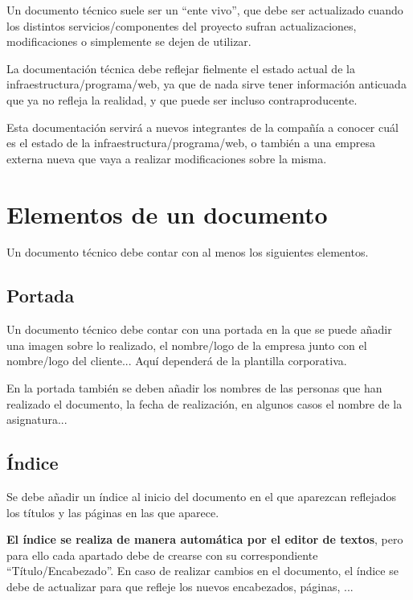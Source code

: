 Un documento técnico suele ser un “ente vivo”, que debe ser actualizado cuando los distintos servicios/componentes del proyecto sufran actualizaciones, modificaciones o simplemente se dejen de utilizar.

La documentación técnica debe reflejar fielmente el estado actual de la infraestructura/programa/web, ya que de nada sirve tener información anticuada que ya no refleja la realidad, y que puede ser incluso contraproducente.

Esta documentación servirá a nuevos integrantes de la compañía a conocer cuál es el estado de la infraestructura/programa/web, o también a una empresa externa nueva que vaya a realizar modificaciones sobre la misma.


\chapter{Elementos de un documento}

Un documento técnico debe contar con al menos los siguientes elementos.

\section{Portada}
Un documento técnico debe contar con una portada en la que se puede añadir una imagen sobre lo realizado, el nombre/logo de la empresa junto con el nombre/logo del cliente... Aquí dependerá de la plantilla corporativa.


En la portada también se deben añadir los nombres de las personas que han realizado el documento, la fecha de realización, en algunos casos el nombre de la asignatura...


\section{Índice}

Se debe añadir un índice al inicio del documento en el que aparezcan reflejados los títulos y las páginas en las que aparece.

\textbf{El índice se realiza de manera automática por el editor de textos}, pero para ello cada apartado debe de crearse con su correspondiente “Título/Encabezado”.  En caso de realizar cambios en el documento, el índice se debe de actualizar para que refleje los nuevos encabezados, páginas, ...


